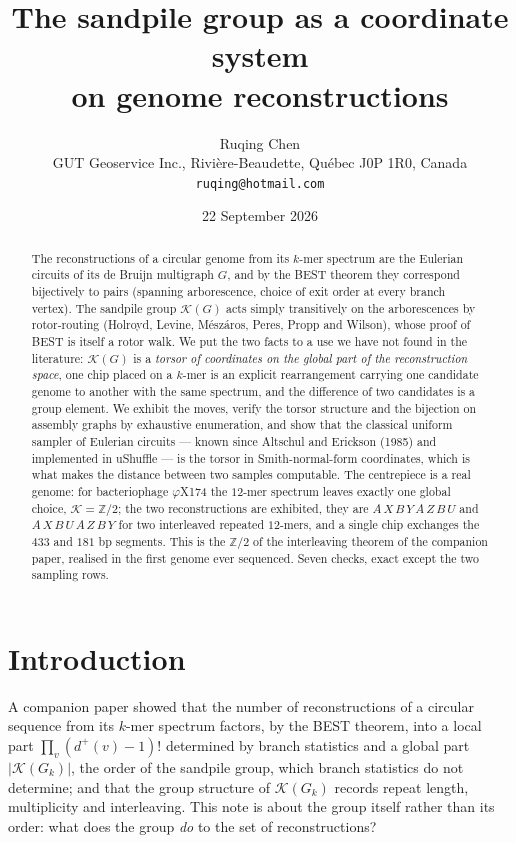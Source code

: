 \documentclass[11pt]{article}
\title{\bfseries The sandpile group as a coordinate system\\ on genome reconstructions}
\author{Ruqing Chen\\[2pt]
\normalsize GUT Geoservice Inc., Rivi\`ere-Beaudette, Qu\'ebec J0P 1R0, Canada\\
\normalsize\texttt{ruqing@hotmail.com}}
\date{22 September 2026}
\theoremstyle{plain}
\theoremstyle{definition}
\theoremstyle{remark}
\newcommand{\Z}{\mathbb{Z}}
\newcommand{\K}{\mathcal{K}}
\begin{document}
\maketitle

\begin{abstract}
\noindent
The reconstructions of a circular genome from its $k$-mer spectrum are the Eulerian
circuits of its de Bruijn multigraph $G$, and by the BEST theorem they correspond
bijectively to pairs (spanning arborescence, choice of exit order at every branch vertex).
The sandpile group $\K(G)$ acts simply transitively on the arborescences by rotor-routing
(Holroyd, Levine, M\'esz\'aros, Peres, Propp and Wilson), whose proof of BEST is itself a
rotor walk. We put the two facts to a use we have not found in the literature: $\K(G)$ is
a \emph{torsor of coordinates on the global part of the reconstruction space}, one chip
placed on a $k$-mer is an explicit rearrangement carrying one candidate genome to another
with the same spectrum, and the difference of two candidates is a group element. We
exhibit the moves, verify the torsor structure and the bijection on assembly graphs by
exhaustive enumeration, and show that the classical uniform sampler of Eulerian circuits
--- known since Altschul and Erickson (1985) and implemented in uShuffle --- is the torsor
in Smith-normal-form coordinates, which is what makes the distance between two samples
computable. The centrepiece is a real genome: for bacteriophage $\varphi$X174 the $12$-mer
spectrum leaves exactly one global choice, $\K=\Z/2$; the two reconstructions are
exhibited, they are $A\,X\,B\,Y\,A\,Z\,B\,U$ and $A\,X\,B\,U\,A\,Z\,B\,Y$ for two interleaved
repeated $12$-mers, and a single chip exchanges the $433$ and $181$ bp segments. This is
the $\Z/2$ of the interleaving theorem of the companion paper, realised in the first
genome ever sequenced. Seven checks, exact except the two sampling rows.
\end{abstract}

\section{Introduction}\label{sec:intro}

A companion paper \cite{Bio1} showed that the number of reconstructions of a circular
sequence from its $k$-mer spectrum factors, by the BEST theorem, into a local part
$\prod_v(d^+(v)-1)!$ determined by branch statistics and a global part $|\K(G_k)|$, the
order of the sandpile group, which branch statistics do not determine; and that the group
structure of $\K(G_k)$ records repeat length, multiplicity and interleaving. This note is
about the group itself rather than its order: what does the group \emph{do} to the set of
reconstructions?
\end{document}
